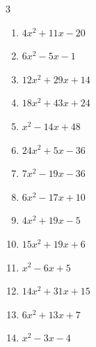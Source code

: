 \begin{multicols}{3}
\begin{enumerate}
  \item $4x^{2}+11x-20$

        \phantom{$=(x+4)(4x-5)$}

  \item $6x^{2}-5x-1$

        \phantom{$=(6x+1)(x-1)$}

  \item $12x^{2}+29x+14$

        \phantom{$=(4x+7)(3x+2)$}

\columnbreak %

\resetques

  \item $18x^{2}+43x+24$

        \phantom{$=(2x+3)(9x+8)$}

  \item $x^{2}-14x+48$

        \phantom{$=(x-8)(x-6)$}

  \item $24x^{2}+5x-36$

        \phantom{$=(8x-9)(3x+4)$}

  \item $7x^{2}-19x-36$

        \phantom{$=(x-4)(7x+9)$}

  \item $6x^{2}-17x+10$

        \phantom{$=(6x-5)(x-2)$}

  \item $4x^{2}+19x-5$

        \phantom{$=(x+5)(4x-1)$}

  \item $15x^{2}+19x+6$

        \phantom{$=(3x+2)(5x+3)$}

  \item $x^{2}-6x+5$

        \phantom{$=(x-1)(x-5)$}

  \item $14x^{2}+31x+15$

        \phantom{$=(2x+3)(7x+5)$}

  \item $6x^{2}+13x+7$

        \phantom{$=(6x+7)(x+1)$}

\columnbreak %

  \item $x^{2}-3x-4$

        \phantom{$=(x-4)(x+1)$}


\end{enumerate}
\end{multicols}
